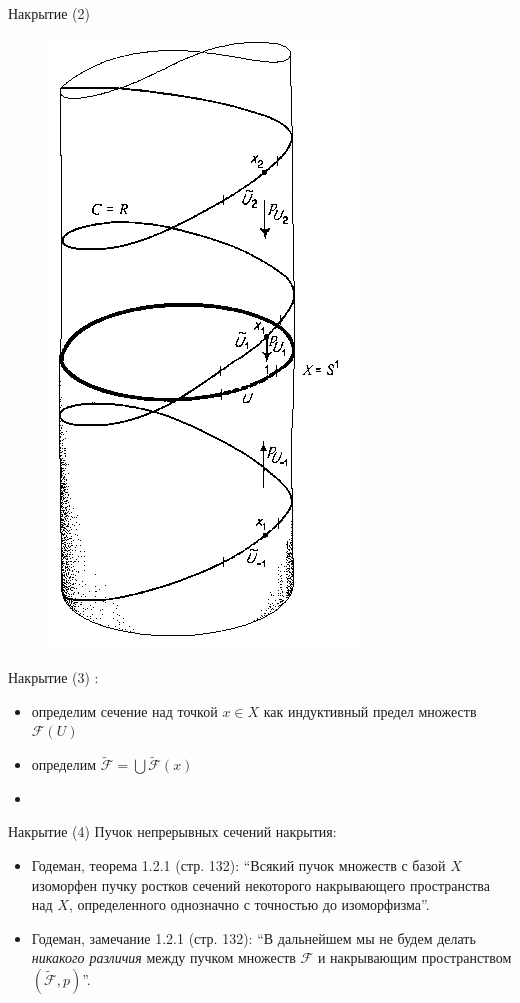 \documentclass{beamer}
\begin{document}
\begin{frame}{Накрытие (2)}
\begin{center}
	\begin{figure}[H]
		\includegraphics[scale=0.3]{covering1.png} 
	\end{figure}
\end{center}
\end{frame}

\begin{frame}{Накрытие (3)}
:\\
\medskip
\begin{itemize}
	\item определим сечение над точкой $x \in X$ как индуктивный предел множеств $\mathcal{F}(U)$
	\item определим $\widetilde{\mathcal{F}} = \bigcup \widetilde{\mathcal{F}}(x)$
	\item 
\end{itemize}
\end{frame}

\begin{frame}{Накрытие (4)}
Пучок непрерывных сечений накрытия:\\
\medskip
\begin{itemize}
    \item Годеман, теорема 1.2.1 (стр. 132): ``Всякий пучок множеств с базой $X$ изоморфен пучку ростков сечений некоторого накрывающего пространства над $X$, определенного однозначно с точностью до изоморфизма''.
    \smallskip
	\item Годеман, замечание 1.2.1 (стр. 132): ``В дальнейшем мы не будем делать \textit{никакого различия} между пучком множеств $\mathcal{F}$ и накрывающим пространством $(\widetilde{\mathcal{F}}, p)$''.
\end{itemize}
\end{frame}
\end{document}
